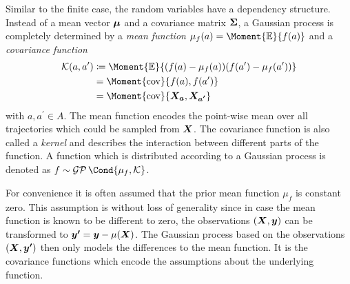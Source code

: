 Similar to the finite case, the random variables have a dependency structure.
Instead of a mean vector $\bm{\mu}$ and a covariance matrix $\bm{\Sigma}$, a Gaussian process is completely determined by a \emph{mean function} $\mu_f(a) = \Moment{\E}{f(a)}$ and a \emph{covariance function}
\begin{align}
    \begin{split}
        \K(a, a^\prime) &\coloneqq \Moment{\E}{(f(a) - \mu_f(a))(f(a^\prime) - \mu_f(a^\prime))} \\
        &= \Moment{\cov}{f(a), f(a^\prime)} \\
        &= \Moment{\cov}{\rv{X_a}, \rv{X_{a^\prime}}}
    \end{split}
\end{align}
with $a, a^\prime \in A$.
The mean function encodes the point-wise mean over all trajectories which could be sampled from $\bm{X}$.
The covariance function is also called a \emph{kernel} and describes the interaction between different parts of the function.
A function which is distributed according to a Gaussian process is denoted as $f \sim \GP\Cond{\mu_f, \K}$.

For convenience it is often assumed that the prior mean function $\mu_f$ is constant zero.
This assumption is without loss of generality \cite{rasmussen_gaussian_2006} since in case the mean function is known to be different to zero, the observations $\left( \bm{X}, \bm{y} \right)$ can be transformed to $\bm{y^\prime} = \bm{y} - \mu(\bm{X})$.
The Gaussian process based on the observations $\left( \bm{X}, \bm{y^\prime} \right)$ then only models the differences to the mean function.
It is the covariance functions which encode the assumptions about the underlying function.

